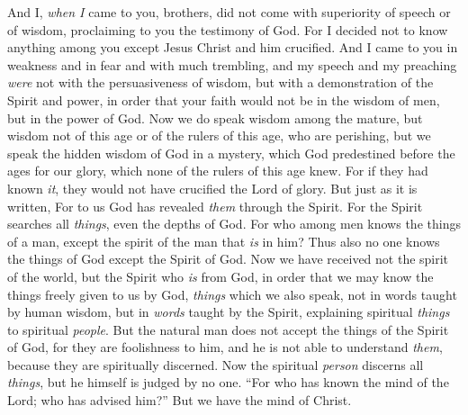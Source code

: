 \begin{biblechapter} %
 And I, \textit{when I} came to you, brothers, did not come with superiority of speech or of wisdom, proclaiming to you the testimony of God.
\verse For I decided not to know anything among you except Jesus Christ and him crucified.
\verse And I came to you in weakness and in fear and with much trembling,
\verse and my speech and my preaching \textit{were} not with the persuasiveness of wisdom, but with a demonstration of the Spirit and power,
\verse in order that your faith would not be in the wisdom of men, but in the power of God.
 Now we do speak wisdom among the mature, but wisdom not of this age or of the rulers of this age, who are perishing,
\verse but we speak the hidden wisdom of God in a mystery, which God predestined before the ages for our glory,
\verse which none of the rulers of this age knew. For if they had known \textit{it}, they would not have crucified the Lord of glory.
\verse But just as it is written,
\verse For to us God has revealed \textit{them} through the Spirit. For the Spirit searches all \textit{things}, even the depths of God.
\verse For who among men knows the things of a man, except the spirit of the man that \textit{is} in him? Thus also no one knows the things of God except the Spirit of God.
\verse Now we have received not the spirit of the world, but the Spirit who \textit{is} from God, in order that we may know the things freely given to us by God,
\verse \textit{things} which we also speak, not in words taught by human wisdom, but in \textit{words} taught by the Spirit, explaining spiritual \textit{things} to spiritual \textit{people}.
\verse But the natural man does not accept the things of the Spirit of God, for they are foolishness to him, and he is not able to understand \textit{them}, because they are spiritually discerned.
\verse Now the spiritual \textit{person} discerns all \textit{things}, but he himself is judged by no one.
\verse “For who has known the mind of the Lord; who has advised him?” But we have the mind of Christ.
\end{biblechapter}

